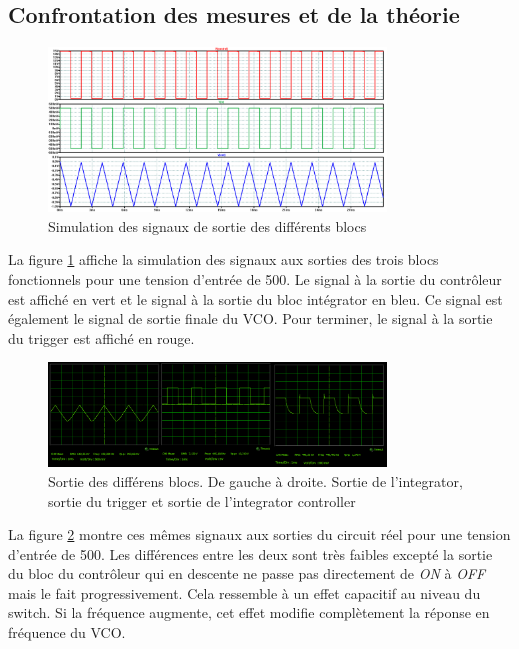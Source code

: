 \subsection{Confrontation  des mesures et de la théorie}
\begin{figure}[ht]
	\centering
	\includegraphics[width=0.8\textwidth]{img-vco/vco_response.png}
	\caption{Simulation des signaux de sortie des différents blocs}
	\label{fig:out_vco_th}
\end{figure}

La figure \ref{fig:out_vco_th} affiche la simulation des signaux 
aux sorties des trois blocs fonctionnels pour une tension d'entrée
de \unit{500}{\milli\volt}. Le signal à la sortie du contrôleur est
affiché en vert et le signal à la sortie du bloc intégrator en bleu.
 Ce signal est également le signal de sortie finale du VCO. Pour terminer, le signal à la sortie du trigger est affiché en rouge.

\begin{figure}[ht]                                       
	\centering
	\includegraphics[width=0.8\textwidth]{img-vco/vco_real_out.png}
	\caption{Sortie des différens blocs. De gauche à droite. Sortie de l'integrator, sortie du trigger et sortie de l'integrator controller}
	\label{fig:out_vco_real}
\end{figure}

La figure \ref{fig:out_vco_real} montre ces mêmes signaux aux sorties
du circuit réel pour une tension d'entrée de \unit{500}{\milli\volt}. 
Les différences entre les deux sont très faibles excepté la sortie du
bloc du contrôleur qui en descente ne passe pas directement 
de \textit{ON} à \textit{OFF} mais le fait progressivement. Cela ressemble à un effet 
capacitif au niveau du switch. Si la fréquence augmente, cet effet 
modifie complètement la réponse en fréquence du VCO.

